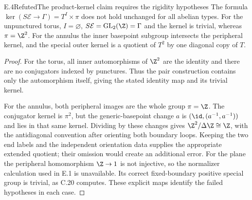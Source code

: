 \begin{claim}{E.4}{Refuted}{The product-kernel claim requires the rigidity hypotheses}
The formula $\ker(S\mathcal E\to\Gamma)=T^I\times\pi$ does not hold
unchanged for all abelian types. For the unpunctured torus,
$I=\varnothing$, $S\mathcal E=\operatorname{GL}_2(\Z)=\Gamma$ and the
kernel is trivial, whereas $\pi=\Z^2$. For the annulus the inner
basepoint subgroup intersects the peripheral kernel, and the special
outer kernel is a quotient of $T^2$ by one diagonal copy of $T$.
\end{claim}
\begin{proof}
For the torus, all inner automorphisms of $\Z^2$ are the identity and
there are no conjugators indexed by punctures. Thus the pair
construction contains only the automorphism itself, giving the stated
identity map and its trivial kernel.

For the annulus, both peripheral images are the whole group
$\pi=\Z$. The conjugator kernel is $\pi^2$, but the generic-basepoint
change $a$ is $(\id,(a^{-1},a^{-1}))$ and lies in that same kernel.
Dividing by these changes gives $\Z^2/\Delta\Z\cong\Z$, with the
antidiagonal convention after orienting both boundary loops. Keeping
the two end labels and the independent orientation data supplies the
appropriate extended quotient; their omission would create an
additional error. For the plane the peripheral homomorphism
$\Z\to1$ is not injective, so the normalizer calculation used in E.1
is unavailable. Its correct fixed-boundary positive special group is
trivial, as C.20 computes. These explicit maps identify the failed
hypotheses in each case.
\end{proof}
